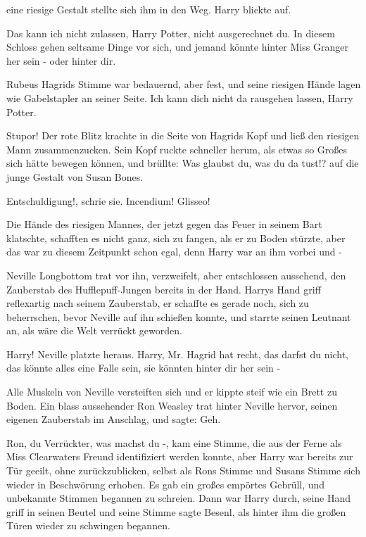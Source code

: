 eine riesige Gestalt stellte sich ihm in den Weg. Harry blickte auf.

\glqq Das kann ich nicht zulassen, Harry Potter, nicht ausgerechnet du. In
diesem Schloss gehen seltsame Dinge vor sich, und jemand könnte hinter Miss
Granger her sein - oder hinter dir.\grqq{}

Rubeus Hagrids Stimme war bedauernd, aber fest, und seine riesigen Hände lagen
wie Gabelstapler an seiner Seite. \glqq Ich kann dich nicht da rausgehen lassen,
Harry Potter.\grqq{}

\glqq Stupor!\grqq{} Der rote Blitz krachte in die Seite von Hagrids Kopf und
ließ den riesigen Mann zusammenzucken. Sein Kopf ruckte schneller herum, als
etwas so Großes sich hätte bewegen können, und brüllte: \glqq Was glaubst du,
was du da tust!?\grqq{} auf die junge Gestalt von Susan Bones.

\glqq Entschuldigung!\grqq{}, schrie sie. \glqq Incendium! Glisseo!\grqq{}

Die Hände des riesigen Mannes, der jetzt gegen das Feuer in seinem Bart
klatschte, schafften es nicht ganz, sich zu fangen, als er zu Boden stürzte,
aber das war zu diesem Zeitpunkt schon egal, denn Harry war an ihm vorbei und -

Neville Longbottom trat vor ihn, verzweifelt, aber entschlossen aussehend, den
Zauberstab des Hufflepuff-Jungen bereits in der Hand. Harrys Hand griff
reflexartig nach seinem Zauberstab, er schaffte es gerade noch, sich zu
beherrschen, bevor Neville auf ihn schießen konnte, und starrte seinen Leutnant
an, als wäre die Welt verrückt geworden.

\glqq Harry!\grqq{} Neville platzte heraus. \glqq Harry, Mr. Hagrid hat recht,
das darfst du nicht, das könnte alles eine Falle sein, sie könnten hinter dir
her sein -\grqq{}

Alle Muskeln von Neville versteiften sich und er kippte steif wie ein Brett zu
Boden. Ein blass aussehender Ron Weasley trat hinter Neville hervor, seinen
eigenen Zauberstab im Anschlag, und sagte: \glqq Geh.\grqq{}

\glqq Ron, du Verrückter, was machst du -\grqq{}, kam eine Stimme, die aus der
Ferne als Miss Clearwaters Freund identifiziert werden konnte, aber Harry war
bereits zur Tür geeilt, ohne zurückzublicken, selbst als Rons Stimme und Susans
Stimme sich wieder in Beschwörung erhoben. Es gab ein großes empörtes Gebrüll,
und unbekannte Stimmen begannen zu schreien. Dann war Harry durch, seine Hand
griff in seinen Beutel und seine Stimme sagte \glqq Besenl\grqq{}, als hinter
ihm die großen Türen wieder zu schwingen begannen.

